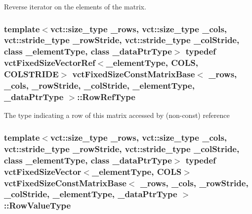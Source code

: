 Reverse iterator on the elements of the matrix. \hypertarget{classvct_fixed_size_const_matrix_base_a2ce1bc7d955f66d28462cb34b62d69b7}{
\subsubsection[{Row\-Ref\-Type}]{\setlength{\rightskip}{0pt plus 5cm}template$<$vct\-::size\-\_\-type \-\_\-rows, vct\-::size\-\_\-type \-\_\-cols, vct\-::stride\-\_\-type \-\_\-row\-Stride, vct\-::stride\-\_\-type \-\_\-col\-Stride, class \-\_\-element\-Type, class \-\_\-data\-Ptr\-Type$>$ typedef {\bf vct\-Fixed\-Size\-Vector\-Ref}$<$\-\_\-element\-Type, {\bf C\-O\-L\-S}, {\bf C\-O\-L\-S\-T\-R\-I\-D\-E}$>$ {\bf vct\-Fixed\-Size\-Const\-Matrix\-Base}$<$ \-\_\-rows, \-\_\-cols, \-\_\-row\-Stride, \-\_\-col\-Stride, \-\_\-element\-Type, \-\_\-data\-Ptr\-Type $>$\-::{\bf Row\-Ref\-Type}}}\label{classvct_fixed_size_const_matrix_base_a2ce1bc7d955f66d28462cb34b62d69b7}
The type indicating a row of this matrix accessed by (non-\/const) reference \hypertarget{classvct_fixed_size_const_matrix_base_a085661aab062c6d975e558be1cfae2d7}{
\subsubsection[{Row\-Value\-Type}]{\setlength{\rightskip}{0pt plus 5cm}template$<$vct\-::size\-\_\-type \-\_\-rows, vct\-::size\-\_\-type \-\_\-cols, vct\-::stride\-\_\-type \-\_\-row\-Stride, vct\-::stride\-\_\-type \-\_\-col\-Stride, class \-\_\-element\-Type, class \-\_\-data\-Ptr\-Type$>$ typedef {\bf vct\-Fixed\-Size\-Vector}$<$\-\_\-element\-Type, {\bf C\-O\-L\-S}$>$ {\bf vct\-Fixed\-Size\-Const\-Matrix\-Base}$<$ \-\_\-rows, \-\_\-cols, \-\_\-row\-Stride, \-\_\-col\-Stride, \-\_\-element\-Type, \-\_\-data\-Ptr\-Type $>$\-::{\bf Row\-Value\-Type}}}\label{classvct_fixed_size_const_matrix_base_a085661aab062c6d975e558be1cfae2d7}
